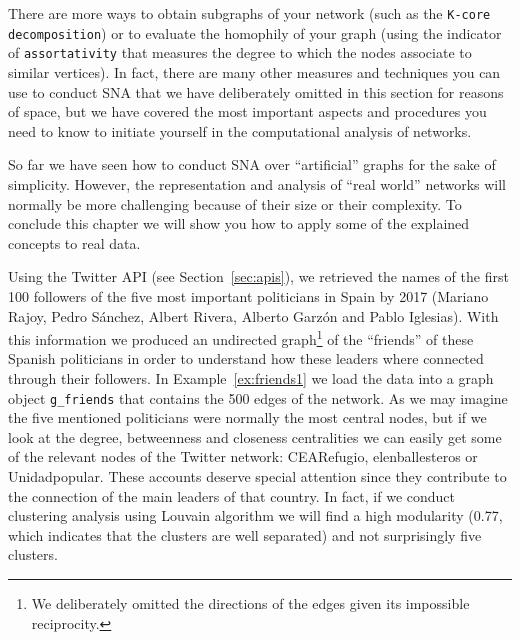 
There are more ways to obtain subgraphs of your network (such as the \texttt{K-core decomposition}) or to evaluate the homophily of your graph (using the indicator of \texttt{assortativity} that measures the degree to which the nodes associate to similar vertices). In fact, there are many other measures and techniques you can use to conduct SNA that we have deliberately omitted in this section for reasons of space, but we have covered the most important aspects and procedures you need to know to initiate yourself in the computational analysis of networks.

So far we have seen how to conduct SNA over ``artificial'' graphs for the sake of simplicity. However, the representation and analysis of ``real world'' networks will normally be more challenging because of their size or their complexity. To conclude this chapter we will show you how to apply some of the explained concepts to real data.

Using the Twitter API (see Section~\ref{sec:apis}), we retrieved the names of the first 100 followers of the five most important politicians in Spain by 2017 (Mariano Rajoy, Pedro S\'anchez, Albert Rivera, Alberto Garz\'on and Pablo Iglesias). With this information we produced an undirected graph\footnote{We deliberately omitted the directions of the edges given its impossible reciprocity.} of the ``friends'' of these Spanish politicians in order to understand how these leaders where connected through their followers. In Example~\ref{ex:friends1} we load the data into a graph object \texttt{g\_friends} that contains the 500 edges of the network. As we may imagine the five mentioned politicians were normally the most central nodes, but if we look at the degree, betweenness and closeness centralities we can easily get some of the relevant nodes of the Twitter network: CEARefugio, elenballesteros or Unidadpopular. These accounts deserve special attention since they contribute to the connection of the main leaders of that country. In fact, if we conduct clustering analysis using Louvain algorithm we will find a high modularity (0.77, which indicates that the clusters are well separated) and not surprisingly five clusters.


